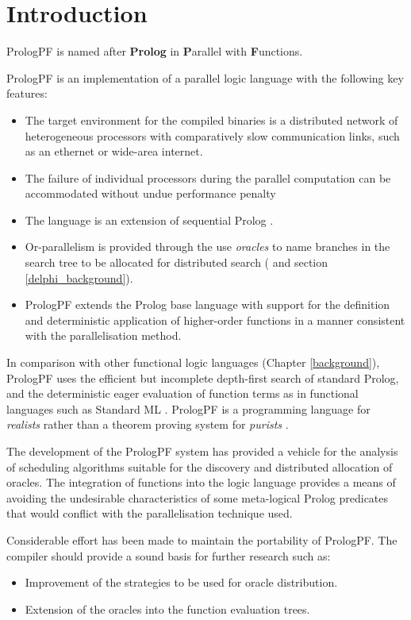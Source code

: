 \chapter{Introduction}
\label{intro}

PrologPF is named after \textbf{Prolog} in \textbf{P}arallel with
\textbf{F}unctions.

PrologPF is an implementation of a parallel logic language with the
following key features:
\begin{itemize}
\item{The target environment for the compiled binaries is a distributed
  network of heterogeneous processors with comparatively slow communication
  links, such as an ethernet or wide-area internet.}
\item{The failure of individual processors during the parallel computation
  can be accommodated without undue performance penalty}
\item{The language is an extension of sequential Prolog \cite{DEDC96}.}
\item{Or-parallelism is provided through the use \textit{oracles}
  to name branches
  in the search tree to be allocated for distributed search
  (\cite{CA87} and section \ref{delphi_background}).}
\item{PrologPF extends the Prolog base language with
  support for the definition and deterministic
  application of higher-order functions
  in a manner consistent with the parallelisation method.}
\end{itemize}

In comparison with other functional logic languages 
(Chapter \ref{background}), PrologPF uses the efficient but incomplete
depth-first search of standard Prolog, and the deterministic eager
evaluation of function terms as in functional languages such as
Standard ML \cite{MTH90}.  PrologPF is a programming language for
\textit{realists} rather than 
a theorem proving system for \textit{purists} \cite{PS91}.

The development of the PrologPF system has provided a vehicle for the
analysis of scheduling algorithms suitable for the discovery and 
distributed allocation of
oracles.
The integration of functions into the
logic language provides a means of avoiding the undesirable
characteristics of some meta-logical Prolog predicates that would conflict with
the parallelisation technique used.

Considerable effort has been made to maintain the
portability of PrologPF.  The compiler
should provide a sound basis for further research such as:
\begin{itemize}
\item{Improvement of the strategies to
  be used for oracle distribution.}
\item{Extension of the oracles into
  the function evaluation trees.}
\end{itemize}


